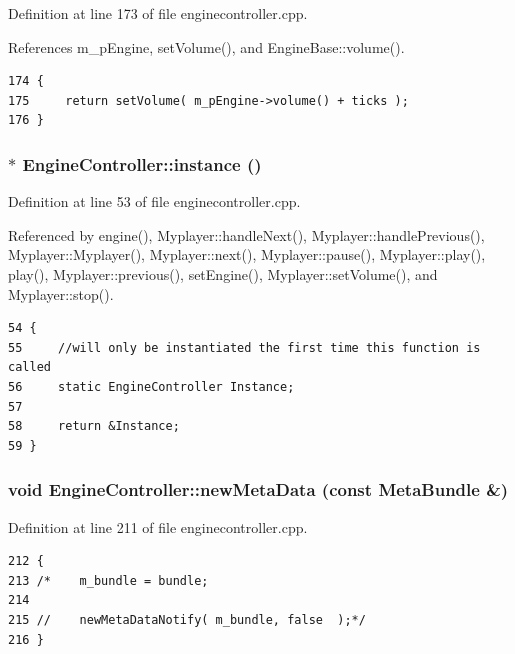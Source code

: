 Definition at line 173 of file enginecontroller.cpp.

References m\_\-p\-Engine, set\-Volume(), and Engine\-Base::volume().



\footnotesize\begin{verbatim}174 {
175     return setVolume( m_pEngine->volume() + ticks );
176 }
\end{verbatim}\normalsize 
{}
\subsubsection{ $\ast$ Engine\-Controller::instance ()\hspace{0.3cm}{\tt  [static]}}\label{classEngineController_EngineControllere0}




Definition at line 53 of file enginecontroller.cpp.

Referenced by engine(), Myplayer::handle\-Next(), Myplayer::handle\-Previous(), Myplayer::Myplayer(), Myplayer::next(), Myplayer::pause(), Myplayer::play(), play(), Myplayer::previous(), set\-Engine(), Myplayer::set\-Volume(), and Myplayer::stop().



\footnotesize\begin{verbatim}54 {
55     //will only be instantiated the first time this function is called
56     static EngineController Instance;
57 
58     return &Instance;
59 }
\end{verbatim}\normalsize 
{}
\subsubsection{\setlength{\rightskip}{0pt plus 5cm}void Engine\-Controller::new\-Meta\-Data (const {\bf Meta\-Bundle} \&)\hspace{0.3cm}{\tt  [inline, private, slot]}}\label{classEngineController_EngineControllerk1}




Definition at line 211 of file enginecontroller.cpp.



\footnotesize\begin{verbatim}212 {
213 /*    m_bundle = bundle;
214 
215 //    newMetaDataNotify( m_bundle, false  );*/
216 }
\end{verbatim}\normalsize 
{}
